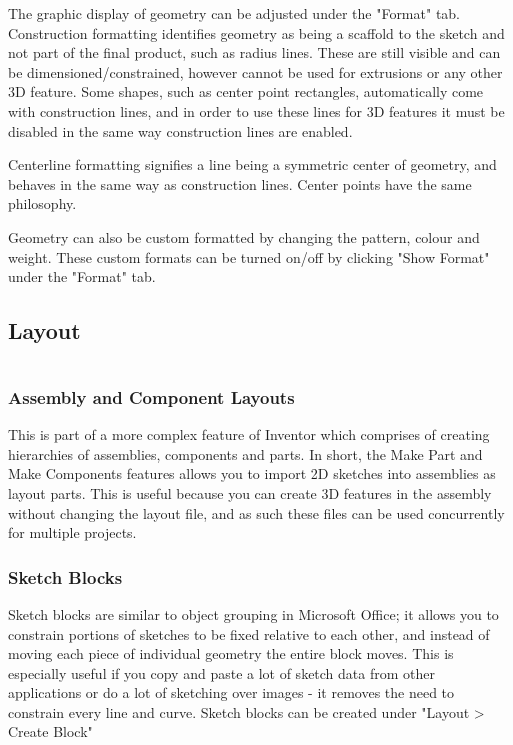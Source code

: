 \begin{enumerate}
The graphic display of geometry can be adjusted under the "Format" tab. Construction formatting identifies geometry as being a scaffold to the sketch and not part of the final product, such as radius lines. These are still visible and can be dimensioned/constrained, however cannot be used for extrusions or any other 3D feature. Some shapes, such as center point rectangles, automatically come with construction lines, and in order to use these lines for 3D features it must be disabled in the same way construction lines are enabled.

Centerline formatting signifies a line being a symmetric center of geometry, and behaves in the same way as construction lines. Center points have the same philosophy.

Geometry can also be custom formatted by changing the pattern, colour and weight. These custom formats can be turned on/off by clicking "Show Format" under the "Format" tab.

\subsection{Layout}

$ $

\subsubsection{Assembly and Component Layouts}
This is part of a more complex feature of Inventor which comprises of creating hierarchies of assemblies, components and parts. In short, the Make Part and Make Components features allows you to import 2D sketches into assemblies as layout parts. This is useful because you can create 3D features in the assembly without changing the layout file, and as such these files can be used concurrently for multiple projects.

\subsubsection{Sketch Blocks}
Sketch blocks are similar to object grouping in Microsoft Office; it allows you to constrain portions of sketches to be fixed relative to each other, and instead of moving each piece of individual geometry the entire block moves. This is especially useful if you copy and paste a lot of sketch data from other applications or do a lot of sketching over images - it removes the need to constrain every line and curve. Sketch blocks can be created under "Layout > Create Block"


\end{enumerate}
